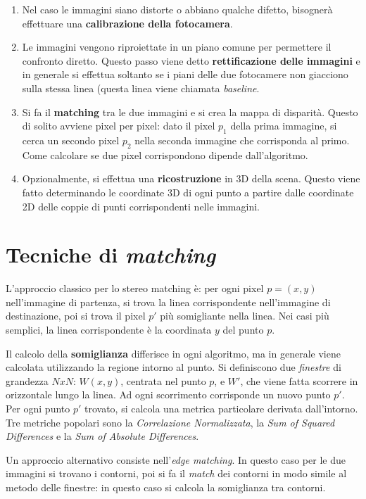 \documentclass[12pt,a4paper,openright,twoside]{report}
\begin{document}
\begin{enumerate}
    \item Nel caso le immagini siano distorte o abbiano qualche difetto, bisognerà effettuare una \textbf{calibrazione della fotocamera}.
    \item Le immagini vengono riproiettate in un piano comune per permettere il confronto diretto. Questo passo viene detto \textbf{rettificazione delle immagini} e in generale si effettua soltanto se i piani delle due fotocamere non giacciono sulla stessa linea (questa linea viene chiamata \textit{baseline}.
    \item Si fa il \textbf{matching} tra le due immagini e si crea la mappa di disparità. Questo di solito avviene pixel per pixel: dato il pixel $p_{1}$ della prima immagine, si cerca un secondo pixel $p_{2}$ nella seconda immagine che corrisponda al primo. Come calcolare se due pixel corrispondono dipende dall'algoritmo.
    \item Opzionalmente, si effettua una \textbf{ricostruzione} in 3D della scena. Questo viene fatto determinando le coordinate 3D di ogni punto a partire dalle coordinate 2D delle coppie di punti corrispondenti nelle immagini.
\end{enumerate}

\section{Tecniche di \textit{matching}}

L'approccio classico per lo stereo matching è: per ogni pixel $p = (x, y)$ nell'immagine di partenza, si trova la linea corrispondente nell'immagine di destinazione, poi si trova il pixel $p'$ più somigliante nella linea. Nei casi più semplici, la linea corrispondente è la coordinata $y$ del punto $p$.

Il calcolo della \textbf{somiglianza} differisce in ogni algoritmo, ma in generale viene calcolata utilizzando la regione intorno al punto. Si definiscono due \textit{finestre} di grandezza $NxN$: $W (x, y)$, centrata nel punto $p$, e $W'$, che viene fatta scorrere in orizzontale lungo la linea. Ad ogni scorrimento corrisponde un nuovo punto $p'$. Per ogni punto $p'$ trovato, si calcola una metrica particolare derivata dall'intorno. Tre metriche popolari sono la \textit{Correlazione Normalizzata}, la \textit{Sum of Squared Differences} e la \textit{Sum of Absolute Differences}.

Un approccio alternativo consiste nell'\textit{edge matching}. In questo caso per le due immagini si trovano i contorni, poi si fa il \textit{match} dei contorni in modo simile al metodo delle finestre: in questo caso si calcola la somiglianza tra contorni.
\end{document}
